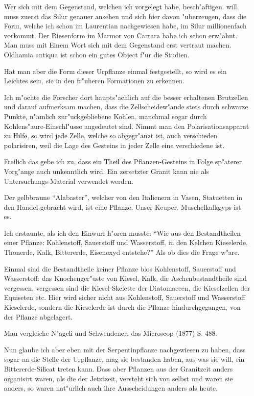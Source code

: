 \documentclass[a4paper, 11pt, oneside, german]{article}
\begin{document}
Wer sich mit dem Gegenstand, welchen ich vorgelegt habe, besch"aftigen. will, muss zuerst das Silur genauer ansehen und sich hier davon "uberzeugen, dass die Form, welche ich schon im Laurentian nachgewiesen habe, im Silur millionenfach vorkommt. Der Riesenform im Marmor von Carrara habe ich schon erw"ahnt. Man muss mit Einem Wort sich mit dem Gegenstand erst vertraut machen. Oldhamia antiqua ist schon ein gutes Object f"ur die Studien.

Hat man aber die Form dieser Urpflanze einmal festgestellt, so wird es ein Leichtes sein, sie in den fr"uheren Formationen zu erkennen.

Ich m"ochte die Forscher dort haupts"achlich auf die besser erhaltenen Brutzellen und darauf aufmerksam machen, dass die Zellscheidew"ande stets durch schwarze Punkte, n"amlich zur"uckgebliebene Kohlen, manchmal sogar durch Kohlens"aure-Einschl"usse angedeutet sind. Nimmt man den Polarisationsapparat zu Hilfe, so wird jede Zelle, welche so abgegr"anzt ist, auch verschieden polarisiren, weil die Lage des Gesteins in jeder Zelle eine verschiedene ist.

Freilich das gebe ich zu, dass ein Theil des Pflanzen-Gesteins in Folge sp"aterer Vorg"ange auch unkenntlich wird. Ein zersetzter Granit kann nie als Untersuchungs-Material verwendet werden.

Der gelbbraune "`Alabaster"', welcher von den Italienern in Vasen, Statuetten in den Handel gebracht wird, ist eine Pflanze. Unser Keuper, Muschelkalkgyps ist es.

Ich erstaunte, als ich den Einwurf h"oren musste: "`Wie aus den Bestandtheilen einer Pflanze: Kohlenstoff, Sauerstoff und Wasserstoff, in den Kelchen Kieselerde, Thonerde, Kalk, Bittererde, Eisenoxyd entstehe?"' Als ob dies die Frage w"are.

Einmal sind die Bestandtheile keiner Pflanze blos Kohlenstoff, Sauerstoff und Wasserstoff: das Knochenger"uste von Kiesel, Kalk, die Aschenbestandtheile sind vergessen, vergessen sind die Kiesel-Skelette der Diatomaceen, die Kieselzellen der Equiseten etc. Hier wird sicher nicht aus Kohlenstoff, Sauerstoff und Wasserstoff Kieselerde, sondern die Kieselerde ist durch die Pflanze hindurchgegangen, von der Pflanze abgelagert.

Man vergleiche N"ageli und Schwendener, das Microscop (1877) S. 488.

Nun glaube ich aber eben mit der Serpentinpflanze nachgewiesen zu haben, dass sogar an die Stelle der Urpflanze, mag sie bestanden haben, aus was sie will, ein Bittererde-Silicat treten kann. Dass aber Pflanzen aus der Granitzeit anders organisirt waren, als die der Jetztzeit, versteht sich von selbst und waren sie anders, so waren nat"urlich auch ihre Ausscheidungen anders als heute.
\end{document}
